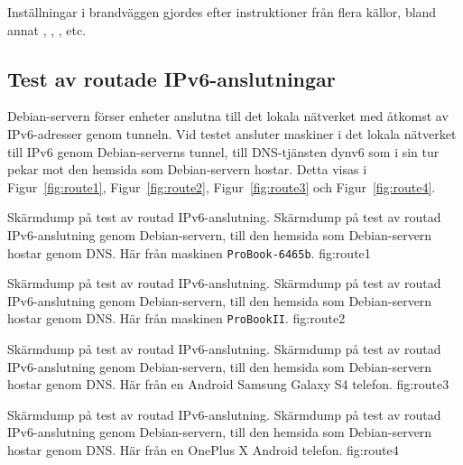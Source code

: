 Inställningar i brandväggen gjordes efter instruktioner från flera källor,
bland annat \cite{ipv6:settingup}, \cite{debian:networkconfig},
\cite{ipv6:tunnelswithdebian}, etc.


\subsection{Test av routade IPv6-anslutningar}
Debian-servern förser enheter anslutna till det lokala nätverket med åtkomst av
IPv6-adresser genom tunneln. Vid testet ansluter maskiner i det lokala
nätverket till IPv6 genom Debian-serverns tunnel, till DNS-tjänsten dynv6 som 
i sin tur pekar mot den hemsida som Debian-servern hostar.  Detta
visas i Figur~\ref{fig:route1}, Figur~\ref{fig:route2}, Figur~\ref{fig:route3}
och Figur~\ref{fig:route4}.

           {Skärmdump på test av routad IPv6-anslutning.}
           {Skärmdump på test av routad IPv6-anslutning genom Debian-servern, 
            till den hemsida som Debian-servern hostar genom DNS.
            Här från maskinen \texttt{ProBook-6465b}.}
           {fig:route1}

           {Skärmdump på test av routad IPv6-anslutning.}
           {Skärmdump på test av routad IPv6-anslutning genom Debian-servern, 
            till den hemsida som Debian-servern hostar genom DNS.
            Här från maskinen \texttt{ProBookII}.}
           {fig:route2}

           {Skärmdump på test av routad IPv6-anslutning.}
           {Skärmdump på test av routad IPv6-anslutning genom Debian-servern, 
            till den hemsida som Debian-servern hostar genom DNS.
            Här från en Android Samsung Galaxy S4 telefon.}
           {fig:route3}

           {Skärmdump på test av routad IPv6-anslutning.}
           {Skärmdump på test av routad IPv6-anslutning genom Debian-servern, 
            till den hemsida som Debian-servern hostar genom DNS.
            Här från en OnePlus X Android telefon.}
           {fig:route4}


